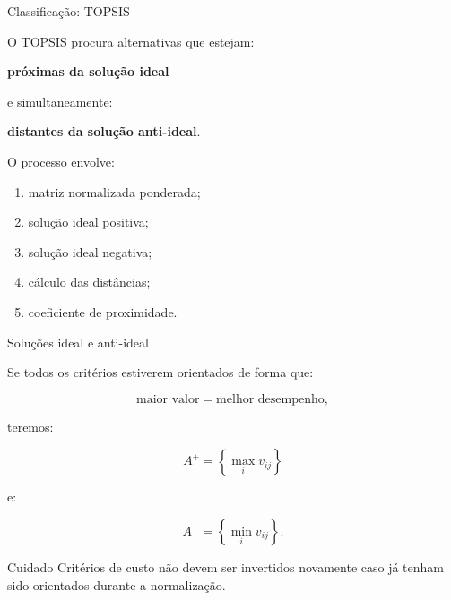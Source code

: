 
\begin{frame}{Classificação: TOPSIS}

    O TOPSIS procura alternativas que estejam:

    \begin{center}
        \textbf{próximas da solução ideal}
    \end{center}

    e simultaneamente:

    \begin{center}
        \textbf{distantes da solução anti-ideal}.
    \end{center}

    \vspace{0.3cm}

    O processo envolve:

    \begin{enumerate}
        \item matriz normalizada ponderada;
        \item solução ideal positiva;
        \item solução ideal negativa;
        \item cálculo das distâncias;
        \item coeficiente de proximidade.
    \end{enumerate}

\end{frame}



\begin{frame}{Soluções ideal e anti-ideal}

    Se todos os critérios estiverem orientados de forma que:

    \[
    \text{maior valor}=\text{melhor desempenho},
    \]

    teremos:

    \[
    A^+
    =
    \left\{
    \max_i v_{ij}
    \right\}
    \]

    e:

    \[
    A^-
    =
    \left\{
    \min_i v_{ij}
    \right\}.
    \]

    \vspace{0.3cm}

    \begin{alertblock}{Cuidado}
        Critérios de custo não devem ser invertidos novamente caso já
        tenham sido orientados durante a normalização.
    \end{alertblock}

\end{frame}


